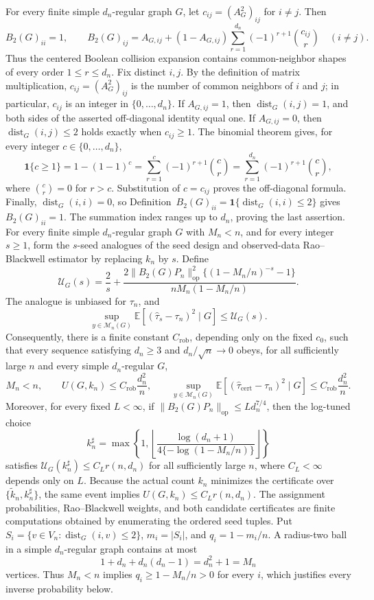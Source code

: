 For every finite simple \(d_n\)-regular graph \(G\), let \(c_{ij}=(A_G^2)_{ij}\) for \(i\ne j\).  Then
\[
B_2(G)_{ii}=1,
\qquad
B_2(G)_{ij}=A_{G,ij}+(1-A_{G,ij})
\sum_{r=1}^{d_n}(-1)^{r+1}\binom{c_{ij}}{r}
\quad(i\ne j).
\]
Thus the centered Boolean collision expansion contains common-neighbor shapes of every order \(1\le r\le d_n\).
Fix distinct \(i,j\).  By the definition of matrix multiplication, \(c_{ij}=(A_G^2)_{ij}\) is the number of common neighbors of \(i\) and \(j\); in particular, \(c_{ij}\) is an integer in \(\{0,\ldots,d_n\}\).  If \(A_{G,ij}=1\), then \(\operatorname{dist}_G(i,j)=1\), and both sides of the asserted off-diagonal identity equal one.  If \(A_{G,ij}=0\), then \(\operatorname{dist}_G(i,j)\le2\) holds exactly when \(c_{ij}\ge1\).  The binomial theorem gives, for every integer \(c\in\{0,\ldots,d_n\}\),
\[
\mathbf 1\{c\ge1\}=1-(1-1)^c
=\sum_{r=1}^{c}(-1)^{r+1}\binom cr
=\sum_{r=1}^{d_n}(-1)^{r+1}\binom cr,
\]
where \(\binom cr=0\) for \(r>c\).  Substitution of \(c=c_{ij}\) proves the off-diagonal formula.  Finally, \(\operatorname{dist}_G(i,i)=0\), so Definition~\(B_2(G)_{ii}=\mathbf 1\{\operatorname{dist}_G(i,i)\le2\}\) gives \(B_2(G)_{ii}=1\).  The summation index ranges up to \(d_n\), proving the last assertion.
For every finite simple \(d_n\)-regular graph \(G\) with \(M_n<n\), and for every integer \(s\ge1\), form the \(s\)-seed analogues of the seed design and observed-data Rao--Blackwell estimator by replacing \(k_n\) by \(s\).  Define
\[
\mathcal U_G(s)=\frac{2}{s}+
\frac{2\|B_2(G)P_n\|_{\mathrm{op}}^2\{(1-M_n/n)^{-s}-1\}}
{nM_n(1-M_n/n)}.
\]
The analogue is unbiased for \(\tau_n\), and
\[
\sup_{y\in\mathcal M_n(G)}
\mathbb E\!\left[(\widehat\tau_s-\tau_n)^2\mid G\right]
\le \mathcal U_G(s).
\]
Consequently, there is a finite constant \(C_{\mathrm{rob}}\), depending only on the fixed \(c_0\), such that every sequence satisfying \(d_n\ge3\) and \(d_n/\sqrt n\to0\) obeys, for all sufficiently large \(n\) and every simple \(d_n\)-regular \(G\),
\[
M_n<n,
\qquad
U(G,k_n)\le C_{\mathrm{rob}}\frac{d_n^2}{n},
\qquad
\sup_{y\in\mathcal M_n(G)}
\mathbb E\!\left[(\widehat\tau_{\mathrm{cert}}-\tau_n)^2\mid G\right]
\le C_{\mathrm{rob}}\frac{d_n^2}{n}.
\]
Moreover, for every fixed \(L<\infty\), if
\(\|B_2(G)P_n\|_{\mathrm{op}}\le Ld_n^{7/4}\), then the log-tuned choice
\[
k_n^\sharp=\max\!\left\{1,\left\lfloor
\frac{\log(d_n+1)}{4\{-\log(1-M_n/n)\}}
\right\rfloor\right\}
\]
satisfies \(\mathcal U_G(k_n^\sharp)\le C_L r(n,d_n)\) for all sufficiently large \(n\), where \(C_L<\infty\) depends only on \(L\).  Because the actual count \(k_n\) minimizes the certificate over \(\{\widetilde k_n,k_n^\sharp\}\), the same event implies \(U(G,k_n)\le C_Lr(n,d_n)\).  The assignment probabilities, Rao--Blackwell weights, and both candidate certificates are finite computations obtained by enumerating the ordered seed tuples.
Put \(S_i=\{v\in V_n:\operatorname{dist}_G(i,v)\le2\}\), \(m_i=|S_i|\), and \(q_i=1-m_i/n\).  A radius-two ball in a simple \(d_n\)-regular graph contains at most
\[
1+d_n+d_n(d_n-1)=d_n^2+1=M_n
\tag{1}
\]
vertices.  Thus \(M_n<n\) implies \(q_i\ge1-M_n/n>0\) for every \(i\), which justifies every inverse probability below.

